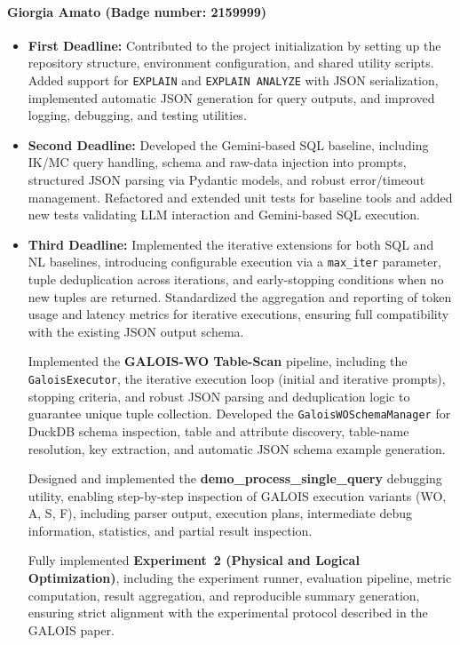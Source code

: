\paragraph{\textbf{Giorgia Amato (Badge number: 2159999)}}
\begin{itemize}[leftmargin=*]
    \item \textbf{First Deadline:} Contributed to the project initialization by setting up the repository structure, environment configuration, and shared utility scripts.
    Added support for \texttt{EXPLAIN} and \texttt{EXPLAIN ANALYZE} with JSON serialization, implemented automatic JSON generation for query outputs, and improved logging, debugging, and testing utilities.

    \item \textbf{Second Deadline:} Developed the Gemini-based SQL baseline, including IK/MC query handling, schema and raw-data injection into prompts, structured JSON parsing via Pydantic models, and robust error/timeout management.
    Refactored and extended unit tests for baseline tools and added new tests validating LLM interaction and Gemini-based SQL execution.

    \item \textbf{Third Deadline:} Implemented the iterative extensions for both SQL and NL baselines, introducing configurable execution via a \texttt{max\_iter} parameter, tuple deduplication across iterations, and early-stopping conditions when no new tuples are returned.
    Standardized the aggregation and reporting of token usage and latency metrics for iterative executions, ensuring full compatibility with the existing JSON output schema.

    Implemented the \textbf{GALOIS-WO Table-Scan} pipeline, including the \texttt{GaloisExecutor}, the iterative execution loop (initial and iterative prompts), stopping criteria, and robust JSON parsing and deduplication logic to guarantee unique tuple collection.
    Developed the \texttt{GaloisWOSchemaManager} for DuckDB schema inspection, table and attribute discovery, table-name resolution, key extraction, and automatic JSON schema example generation.

    Designed and implemented the \textbf{demo\_process\_single\_query} debugging utility, enabling step-by-step inspection of GALOIS execution variants (WO, A, S, F), including parser output, execution plans, intermediate debug information, statistics, and partial result inspection.

    Fully implemented \textbf{Experiment~2 (Physical and Logical Optimization)}, including the experiment runner, evaluation pipeline, metric computation, result aggregation, and reproducible summary generation, ensuring strict alignment with the experimental protocol described in the GALOIS paper.


\end{itemize}
